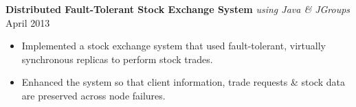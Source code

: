 \documentclass[10pt]{article}
\begin{document}
\textbf{Distributed Fault-Tolerant Stock Exchange System} \textit{using Java \& JGroups} \hfill April 2013
\begin{itemize}
    \item Implemented a stock exchange system that used fault-tolerant, virtually synchronous replicas to perform stock trades.
    \item Enhanced the system so that client information, trade requests \& stock data are preserved across node failures. %
\end{itemize}




\end{document}
